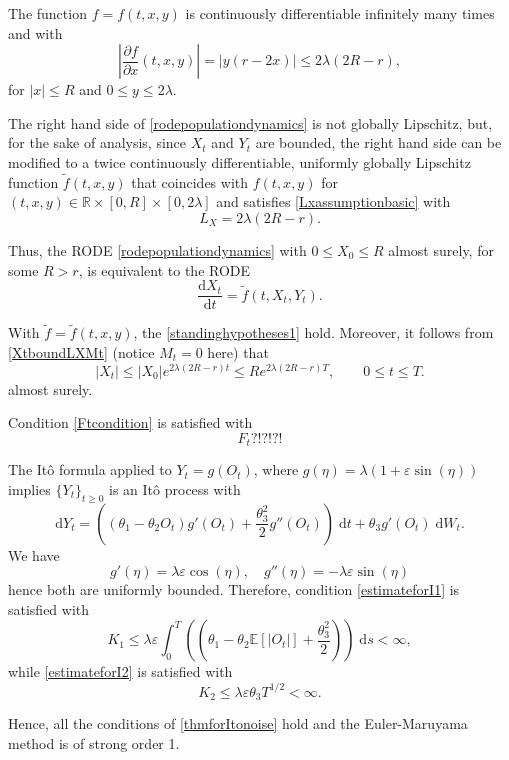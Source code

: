 \documentclass[reqno,12pt]{amsart}
\theoremstyle{plain}%
\theoremstyle{definition}
\begin{document}
The function $f=f(t, x, y)$ is continuously differentiable infinitely many times and with
\[
    \left|\frac{\partial f}{\partial x}(t, x, y)\right| = |y(r - 2x)|\leq 2\lambda (2R - r),
\]
for $|x| \leq R$ and $0 \leq y \leq 2\lambda$.

The right hand side of \eqref{rodepopulationdynamics} is not globally Lipschitz, but, for the sake of analysis, since $X_t$ and $Y_t$ are bounded, the right hand side can be modified to a twice continuously differentiable, uniformly globally Lipschitz function $\tilde f(t, x, y)$ that coincides with $f(t, x, y)$ for $(t, x, y) \in \mathbb{R}\times [0, R]\times [0, 2\lambda]$ and satisfies \eqref{Lxassumptionbasic} with
\[
    L_X = 2\lambda (2R - r).
\]

Thus, the RODE \eqref{rodepopulationdynamics} with $0\leq X_0 \leq R$ almost surely, for some $R > r$, is equivalent to the RODE
\begin{equation}
    \label{rodepopulationdynamicstruncated}
    \frac{\mathrm{d}X_t}{\mathrm{d}t} = \tilde f(t, X_t, Y_t).
\end{equation}

With $\tilde f=\tilde f(t, x, y)$, the \cref{standinghypotheses1} hold. Moreover, it follows from \eqref{XtboundLXMt} (notice $M_t = 0$ here) that
\[
    |X_t| \leq |X_0|e^{2\lambda (2R - r)t} \leq R e^{2\lambda (2R - r)T}, \qquad 0 \leq t \leq T.
\]
almost surely. 

Condition \eqref{Ftcondition} is satisfied with
\[
    F_t ?!?!?!
\]

The It\^o formula applied to $Y_t = g(O_t)$, where $g(\eta) = \lambda (1 + \varepsilon \sin(\eta))$ implies $\{Y_t\}_{t\geq 0}$ is an It\^o process with
\[
    \mathrm{d}Y_t = \left((\theta_1 - \theta_2 O_t)g'(O_t) + \frac{\theta_3^2}{2}g''(O_t)\right)\;\mathrm{d}t + \theta_3 g'(O_t)\;\mathrm{d}W_t.
\]
We have
\[
    g'(\eta) = \lambda \varepsilon \cos(\eta), \quad g''(\eta) = -\lambda\varepsilon\sin(\eta)
\]
hence both are uniformly bounded. Therefore, condition \eqref{estimateforI1} is satisfied with
\[
    K_1 \leq \lambda\varepsilon \int_0^T \left( (\theta_1 - \theta_2 \mathbb{E}[|O_t|] + \frac{\theta_3^2}{2})\right) \;\mathrm{d}s < \infty,
\]
while \eqref{estimateforI2} is satisfied with
\[
    K_2 \leq \lambda\varepsilon\theta_3 T^{1/2} < \infty.
\]

Hence, all the conditions of \cref{thmforItonoise} hold and the Euler-Maruyama method is of strong order 1.
\end{document}
